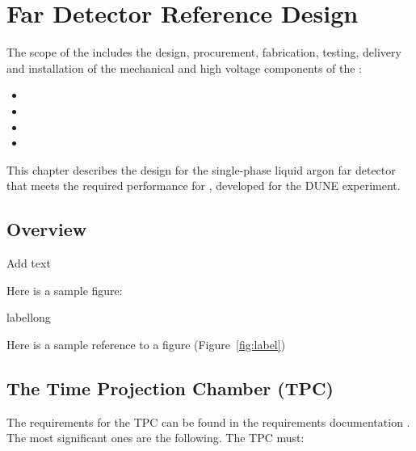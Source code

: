 \chapter{Far Detector Reference Design}
\label{ch:detectors-fd-ref}

The scope of the \fixme{} includes the design, procurement, fabrication, testing, delivery and installation of the mechanical and high voltage components of the \fixme{}: 
\begin{itemize}
\item  
\item 
\item 
\item 
\end{itemize}
This chapter describes the design for the single-phase liquid argon far detector that meets the required performance for \fixme{}, developed for the DUNE experiment.

\section{Overview}
\label{sec:detectors-fd-ref-ov}

Add text

Here is a sample figure: 

\begin{cdrfigure}[short]{label}{long}
\end{cdrfigure}


Here is a sample reference to a figure (Figure~\ref{fig:label})



\section{The Time Projection Chamber (TPC)} 
\label{sec:detectors-fd-ref-tpc}


The requirements for the TPC can be found in the requirements documentation \cite{lar-fd-req}. The most significant ones are the following. The TPC must:

